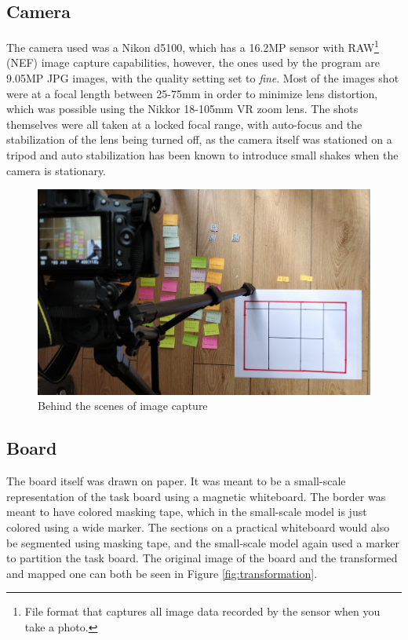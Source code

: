 \documentclass[12pt]{report}
\theoremstyle{definition}
\theoremstyle{remark}
\begin{document}
\subsection{Camera}
The camera used was a Nikon d5100, which has a 16.2MP sensor with RAW\footnote{File format that captures all image data recorded by the sensor when you take a photo.} (NEF) image capture capabilities, however, the ones used by the program are 9.05MP JPG images, with the quality setting set to \textit{fine}. Most of the images shot were at a focal length between 25-75mm in order to minimize lens distortion, which was possible using the Nikkor 18-105mm VR zoom lens. The shots themselves were all taken at a locked focal range, with auto-focus and the stabilization of the lens being turned off, as the camera itself was stationed on a tripod and auto stabilization has been known to introduce small shakes when the camera is stationary.

\begin{figure}[h]
    \centering
    \includegraphics[width=\textwidth]{img/setup.jpg}
    \caption{Behind the scenes of image capture}
    \label{fig:setup}
\end{figure}

\subsection{Board}
The board itself was drawn on paper. It was meant to be a small-scale representation of the task board using a magnetic whiteboard. The border was meant to have colored masking tape, which in the small-scale model is just colored using a wide marker. The sections on a practical whiteboard would also be segmented using masking tape, and the small-scale model again used a marker to partition the task board. The original image of the board and the transformed and mapped one can both be seen in Figure \ref{fig:transformation}.
\end{document}
